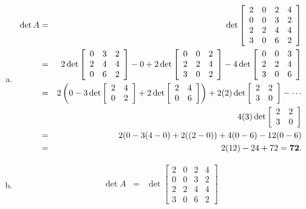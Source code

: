 \vspace{2mm}
\begin{enumerate}[a)]
  \item
\begin{eqnarray*}
  \det A&=&\det\left[\begin{array}{cccc}2&0&2&4\\0&0&3&2\\2&2&4&4\\3&0&6&2\end{array}\right]\\
	&=&2\det\left[\begin{array}{ccc}0&3&2\\2&4&4\\0&6&2\end{array}\right]-0
	+2\det\left[\begin{array}{ccc}0&0&2\\2&2&4\\3&0&2\end{array}\right]
	-4\det\left[\begin{array}{ccc}0&0&3\\2&2&4\\3&0&6\end{array}\right]\\
	&=&2\left(0-3\det\left[\begin{array}{cc}2&4\\0&2\end{array}\right]
	+2\det\left[\begin{array}{cc}2&4\\0&6\end{array}\right]\right)
	+2(2)\det\left[\begin{array}{cc}2&2\\3&0\end{array}\right]-\cdots\\
	&&\qquad4(3)\det\left[\begin{array}{cc}2&2\\3&0\end{array}\right]\\
	&=&2(0-3(4-0)+2((2-0))+4(0-6)-12(0-6)\\
	&=&2(12)-24+72=\bf72.
\end{eqnarray*}
\item
\begin{eqnarray*}
  \det A&=&\det\left[\begin{array}{cccc}2&0&2&4\\0&0&3&2\\2&2&4&4\\3&0&6&2\end{array}\right]\\

\end{eqnarray*}
\end{enumerate}
